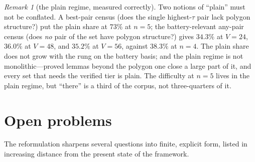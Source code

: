 \documentclass[11pt,a4paper]{article}
\numberwithin{equation}{section}
\theoremstyle{plain}
\theoremstyle{definition}
\theoremstyle{remark}
\newtheorem{remark}[theorem]{Remark}
\begin{document}
\begin{remark}[the plain regime, measured correctly]\label{rem:plain}
Two notions of ``plain'' must not be conflated. A best-pair census (does
the single highest-$\tau$ pair lack polygon structure?) put the plain
share at $73\%$ at $n=5$; the battery-relevant any-pair census (does
\emph{no} pair of the set have polygon structure?) gives
$34.3\%$ at $V=24$, $36.0\%$ at $V=48$, and $35.2\%$ at $V=56$, against
$38.3\%$ at $n=4$.
The plain share does not grow with the rung on the battery basis; and
the plain regime is not monolithic---proved lemmas beyond the polygon one
close a large part of it, and every set that needs the verified tier is
plain. The difficulty at $n=5$ lives in the plain regime, but ``there''
is a third of the corpus, not three-quarters of it.
\end{remark}


\section{Open problems}\label{sec:open}

The reformulation sharpens several questions into finite, explicit form,
listed in increasing distance from the present
state of the framework.
\end{document}

